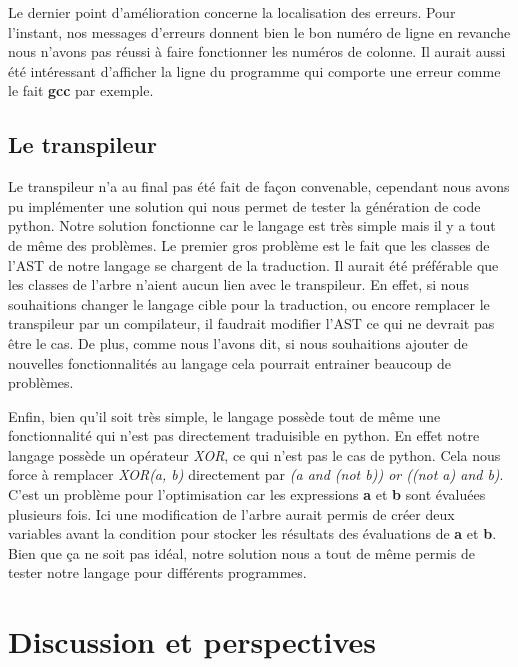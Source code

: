 \documentclass[a4paper]{article}%
\begin{document}
Le dernier point d'amélioration concerne la localisation des erreurs. Pour
l'instant, nos messages d'erreurs donnent bien le bon numéro de ligne en
revanche nous n'avons pas réussi à faire fonctionner les numéros de colonne. Il
aurait aussi été intéressant d'afficher la ligne du programme qui comporte une
erreur comme le fait \textbf{gcc} par exemple.\\


\subsection{Le transpileur}

Le transpileur n'a au final pas été fait de façon convenable, cependant nous
avons pu implémenter une solution qui nous permet de tester la génération de
code python. Notre solution fonctionne car le langage est très simple mais il y
a tout de même des problèmes. Le premier gros problème est le fait que les
classes de l'AST de notre langage se chargent de la traduction. Il aurait été
préférable que les classes de l'arbre n'aient aucun lien avec le transpileur. En
effet, si nous souhaitions changer le langage cible pour la traduction, ou
encore remplacer le transpileur par un compilateur, il faudrait modifier l'AST
ce qui ne devrait pas être le cas. De plus, comme nous l'avons dit, si nous
souhaitions ajouter de nouvelles fonctionnalités au langage cela pourrait
entrainer beaucoup de problèmes.

Enfin, bien qu'il soit très simple, le langage possède tout de même une
fonctionnalité qui n'est pas directement traduisible en python. En effet notre
langage possède un opérateur \textit{XOR}, ce qui n'est pas le cas de python.
Cela nous force à remplacer \textit{XOR(a, b)} directement par \textit{(a and
(not b)) or ((not a) and b)}. C'est un problème pour l'optimisation car les
expressions \textbf{a} et \textbf{b} sont évaluées plusieurs fois. Ici une
modification de l'arbre aurait permis de créer deux variables avant la condition
pour stocker les résultats des évaluations de \textbf{a} et \textbf{b}.\\

Bien que ça ne soit pas idéal, notre solution nous a tout de même permis de
tester notre langage pour différents programmes.


\section{Discussion et perspectives}
\end{document}
